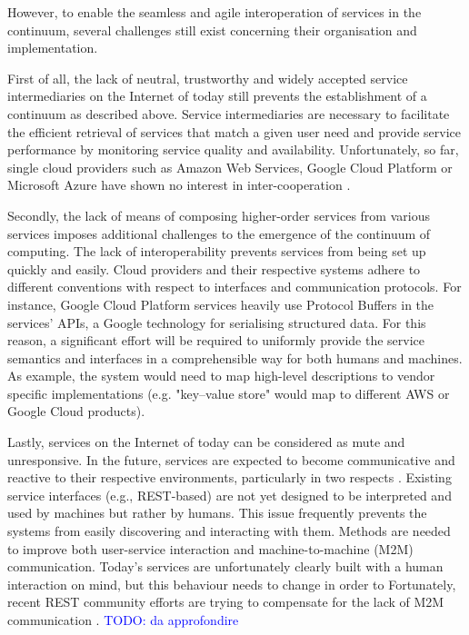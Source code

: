 However, to enable the seamless and agile interoperation of services in the continuum, several challenges still exist concerning their organisation and implementation.

First of all, the lack of neutral, trustworthy and widely accepted service intermediaries on the Internet of today still prevents the establishment of a continuum as described above. Service intermediaries are necessary to facilitate the efficient retrieval of services that match a given user need and provide service performance by monitoring service quality and availability. Unfortunately, so far, single cloud providers such as Amazon Web Services, Google Cloud Platform or Microsoft Azure have shown no interest in inter-cooperation \cite{inter-cloud}.

Secondly, the lack of means of composing higher-order services from various services imposes additional challenges to the emergence of the continuum of computing. The lack of interoperability prevents services from being set up quickly and easily. Cloud providers and their respective systems adhere to different conventions with respect to interfaces and communication protocols. For instance, Google Cloud Platform services heavily use Protocol Buffers \cite{protobuf} in the services' APIs, a Google technology for serialising structured data. For this reason, a significant effort will be required to uniformly provide the service semantics and interfaces in a comprehensible way for both humans and machines. As example, the system would need to map high-level descriptions to vendor specific implementations (e.g. "key–value store" would map to different AWS or Google Cloud products).

Lastly, services on the Internet of today can be considered as mute and unresponsive. In the future, services are expected to become communicative and reactive to their respective environments, particularly in two respects \cite{iot-enterprise}. Existing service interfaces (e.g., REST-based) are not yet designed to be interpreted and used by machines but rather by humans. This issue frequently prevents the systems from easily discovering and interacting with them. Methods are needed to improve both user-service interaction and machine-to-machine (M2M) communication. Today's services are unfortunately clearly built with a human interaction on mind, but this behaviour needs to change in order to  Fortunately, recent REST community efforts are trying to compensate for the lack of M2M communication \cite{openapi}. \textcolor{blue}{TODO: da approfondire}

